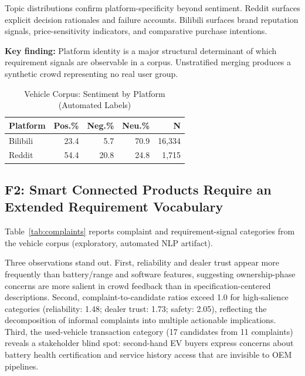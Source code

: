 \documentclass[conference]{IEEEtran}
\begin{document}
Topic distributions confirm platform-specificity beyond sentiment. Reddit surfaces explicit decision rationales and failure accounts. Bilibili surfaces brand reputation signals, price-sensitivity indicators, and comparative purchase intentions.

\textbf{Key finding:} Platform identity is a major structural determinant of which requirement signals are observable in a corpus. Unstratified merging produces a synthetic crowd representing no real user group.

\begin{table}[htb]
\caption{Vehicle Corpus: Sentiment by Platform (Automated Labels)}
\label{tab:sentiment}
\centering\small
\begin{tabular}{lrrrr}
\toprule
Platform & Pos.\% & Neg.\% & Neu.\% & N \\
\midrule
Bilibili & 23.4 & 5.7  & 70.9 & 16,334 \\
Reddit   & 54.4 & 20.8 & 24.8 &  1,715 \\
\bottomrule
\end{tabular}
\end{table}

\subsection{F2: Smart Connected Products Require an Extended Requirement Vocabulary}

Table~\ref{tab:complaints} reports complaint and requirement-signal categories from the vehicle corpus (exploratory, automated NLP artifact).

Three observations stand out. First, reliability and dealer trust appear more frequently than battery/range and software features, suggesting ownership-phase concerns are more salient in crowd feedback than in specification-centered descriptions. Second, complaint-to-candidate ratios exceed 1.0 for high-salience categories (reliability: 1.48; dealer trust: 1.73; safety: 2.05), reflecting the decomposition of informal complaints into multiple actionable implications. Third, the used-vehicle transaction category (17 candidates from 11 complaints) reveals a stakeholder blind spot: second-hand EV buyers express concerns about battery health certification and service history access that are invisible to OEM pipelines.
\end{document}
